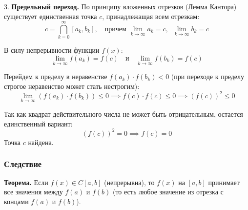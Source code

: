 \begin{tcolorbox}[title=Доказательство (Метод деления отрезка пополам)]
	3. \textbf{Предельный переход.}
	По принципу вложенных отрезков (Лемма Кантора) существует единственная точка $c$, принадлежащая всем отрезкам:
	\[ c = \bigcap_{k=0}^{\infty} [a_k, b_k], \quad \text{причем } \lim_{k\to\infty} a_k = c, \;\; \lim_{k\to\infty} b_k = c \]
	
	В силу непрерывности функции $f(x)$:
	\[ \lim_{k\to\infty} f(a_k) = f(c) \quad \text{и} \quad \lim_{k\to\infty} f(b_k) = f(c) \]
	
	Перейдем к пределу в неравенстве $f(a_k) \cdot f(b_k) < 0$ (при переходе к пределу строгое неравенство может стать нестрогим):
	\[ \lim_{k\to\infty} (f(a_k) \cdot f(b_k)) \le 0 \implies f(c) \cdot f(c) \le 0 \implies (f(c))^2 \le 0 \]
	
	Так как квадрат действительного числа не может быть отрицательным, остается единственный вариант:
	\[ (f(c))^2 = 0 \implies f(c) = 0 \]
	Точка $c$ найдена.
\end{tcolorbox}

\subsubsection*{Следствие}

\textbf{Теорема.} Если $f(x) \in C[a, b]$ (непрерывна), то $f(x)$ на $[a, b]$ принимает все значения между $f(a)$ и $f(b)$ (то есть любое значение из отрезка с концами $f(a)$ и $f(b)$).

